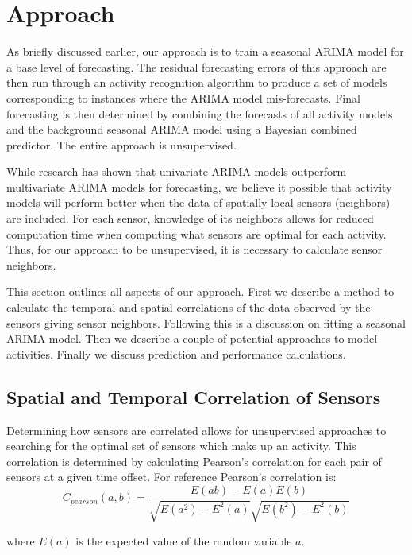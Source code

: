 \chapter{Approach}
As briefly discussed earlier, our approach is to train a seasonal ARIMA model for a base level of forecasting.  The residual forecasting errors of this approach are then run through an activity recognition algorithm to produce a set of models corresponding to instances where the ARIMA model mis-forecasts.  Final forecasting is then determined by combining the forecasts of all activity models and the background seasonal ARIMA model using a Bayesian combined predictor.  The entire approach is unsupervised.

While research has shown that univariate ARIMA models outperform multivariate ARIMA models for forecasting, we believe it possible that activity models will perform better when the data of spatially local sensors (neighbors) are included.  For each sensor, knowledge of its neighbors allows for reduced computation time when computing what sensors are optimal for each activity.  Thus, for our approach to be unsupervised, it is necessary to calculate sensor neighbors.

This section outlines all aspects of our approach.  First we describe a method to calculate the temporal and spatial correlations of the data observed by the sensors giving sensor neighbors.  Following this is a discussion on fitting a seasonal ARIMA model.  Then we describe a couple of potential approaches to model activities.  Finally we discuss prediction and performance calculations.

\section{Spatial and Temporal Correlation of Sensors}
Determining how sensors are correlated allows for unsupervised approaches to searching for the optimal set of sensors which make up an activity.  This correlation is determined by calculating Pearson's correlation for each pair of sensors at a given time offset.  For reference Pearson's correlation is:
\begin{equation}
\label{eq:pearson}
C_{pearson}(a, b) = \frac{E(ab) - E(a)E(b)}{\sqrt{E(a^{2})-E^{2}(a)}\sqrt{E(b^{2})-E^{2}(b)}}
\end{equation}

\noindent
where $E(a)$ is the expected value of the random variable $a$.

